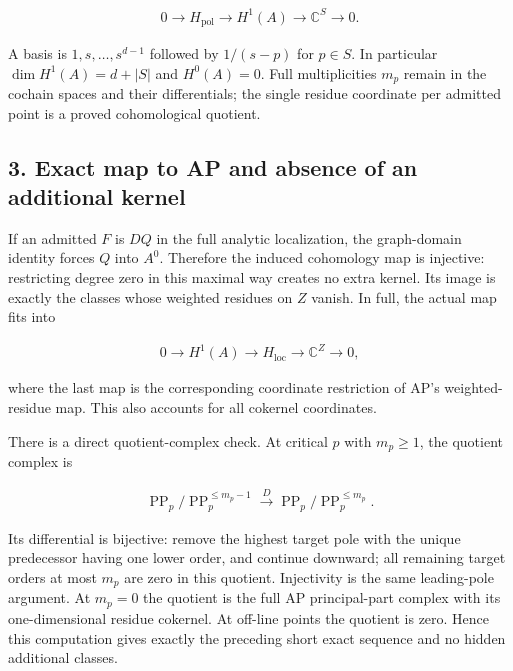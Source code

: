 \[
\begin{gathered}
0\longrightarrow H_{\mathrm{pol}}\longrightarrow H^1(A)\longrightarrow\mathbb C^S\longrightarrow0.
\end{gathered}
\]


A basis is \(1,s,\ldots,s^{d-1}\) followed by \(1/(s-p)\) for \(p\in S\).
In particular \(\dim H^1(A)=d+|S|\) and \(H^0(A)=0\). Full multiplicities
\(m_p\) remain in the cochain spaces and their differentials; the single
residue coordinate per admitted point is a proved cohomological quotient.


\subsection*{3. Exact map to AP and absence of an additional kernel}


If an admitted \(F\) is \(DQ\) in the full analytic localization, the graph-domain
identity forces \(Q\) into \(A^0\). Therefore the induced cohomology map is
injective: restricting degree zero in this maximal way creates no extra
kernel. Its image is exactly the classes whose weighted residues on \(Z\)
vanish. In full, the actual map fits into


\[
\begin{gathered}
0\longrightarrow H^1(A)\longrightarrow H_{\mathrm{loc}}\longrightarrow\mathbb C^Z\longrightarrow0,
\end{gathered}
\]


where the last map is the corresponding coordinate restriction of AP's
weighted-residue map. This also accounts for all cokernel coordinates.


There is a direct quotient-complex check. At critical \(p\) with \(m_p\ge1\),
the quotient complex is


\[
\begin{gathered}
\operatorname{PP}_p/\operatorname{PP}_p^{\le m_p-1}\xrightarrow{D}\operatorname{PP}_p/\operatorname{PP}_p^{\le m_p}.
\end{gathered}
\]


Its differential is bijective: remove the highest target pole with the
unique predecessor having one lower order, and continue downward; all
remaining target orders at most \(m_p\) are zero in this quotient. Injectivity
is the same leading-pole argument. At \(m_p=0\) the quotient is the full AP
principal-part complex with its one-dimensional residue cokernel. At
off-line points the quotient is zero. Hence this computation gives exactly
the preceding short exact sequence and no hidden additional classes.


